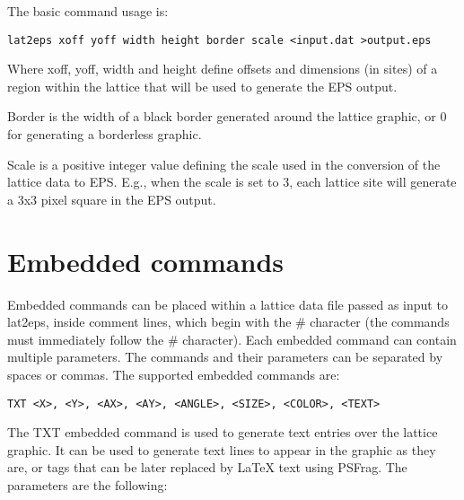 \documentclass[a4paper]{article}
\begin{document}
The basic command usage is:
\bigbreak

\texttt{lat2eps  xoff yoff width height border scale  <input.dat  >output.eps}
\bigbreak

Where xoff, yoff, width and height define offsets and dimensions (in sites) of a region within the lattice that will be used to generate the EPS output.
\bigbreak

Border is the width of a black border generated around the lattice graphic, or 0 for generating a borderless graphic.
\bigbreak

Scale is a positive integer value defining the scale used in the conversion of the lattice data to EPS. E.g., when the scale is set to 3, each lattice site will generate a 3x3 pixel square in the EPS output.
\bigbreak


\section{Embedded commands}
\bigbreak

Embedded commands can be placed within a lattice data file passed as input to lat2eps, inside comment lines, which begin with the \# character (the commands must immediately follow the \# character). Each embedded command can contain multiple parameters. The commands and their parameters can be separated by spaces or commas. The supported embedded commands are:
\bigbreak\bigbreak

\texttt{TXT <X>, <Y>, <AX>, <AY>, <ANGLE>, <SIZE>, <COLOR>, <TEXT>}
\bigbreak

The TXT embedded command is used to generate text entries over the lattice graphic. It can be used to generate text lines to appear in the graphic as they are, or tags that can be later replaced by LaTeX text using PSFrag. The parameters are the following:
\end{document}
